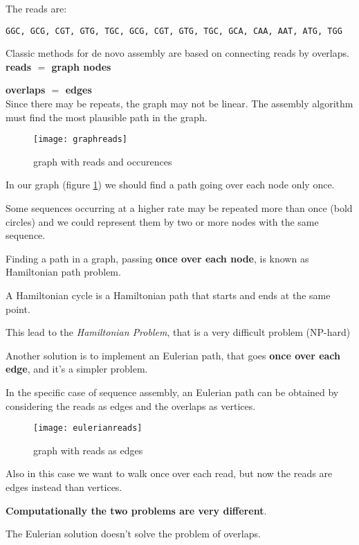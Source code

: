 The reads are:

\texttt{GGC, GCG, CGT, GTG, TGC, GCG, CGT, GTG, TGC, GCA, CAA, AAT, ATG, TGG}

Classic methods for de novo assembly are based on connecting reads by overlaps.\\
 
\textbf{reads $=$ graph nodes}
 
\textbf{overlaps $=$ edges}\\

Since there may be repeats, the graph may not be linear. 
The assembly algorithm must find the most plausible path in the graph.

\begin{figure}[H]
  \centering
  \texttt{[image: graphreads]}
  \caption{graph with reads and occurences}
  \label{fig:graphreads}
\end{figure}

In our graph (figure \ref{fig:graphreads}) we should find a path 
going over each node only once.

Some sequences occurring at a higher rate may be repeated more 
than once (bold circles) and we could represent them by two or more nodes
with the same sequence. 

Finding a path in a graph, passing \textbf{once over each node}, is known as
Hamiltonian path problem.

A Hamiltonian cycle is a Hamiltonian path that starts and ends at the same point.

This lead to the \textit{Hamiltonian Problem}, that is a
very difficult problem (NP-hard)

Another solution is to implement an Eulerian path, that goes
\textbf{once over each edge}, and it's a simpler problem.

In the specific case of sequence assembly, an  Eulerian path can be
obtained by considering the reads as edges and the overlaps as vertices.

\begin{figure}[H]
  \centering
  \texttt{[image: eulerianreads]}
  \caption{graph with reads as edges}
  \label{fig:eulerianreads}
\end{figure}

Also in this case we want to walk once over each read, but 
now the reads are edges instead than vertices.

\textbf{Computationally the two problems are very different}.

The Eulerian solution doesn't solve the problem of overlaps.

